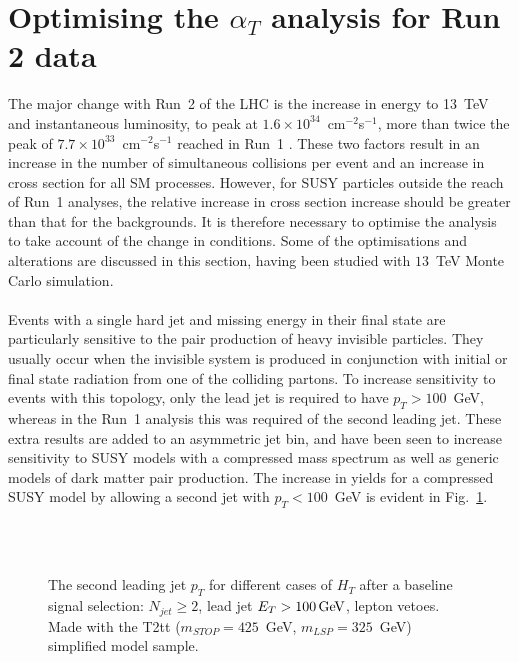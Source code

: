 
\section{Optimising the $\alpha_T$ analysis for Run 2 data}
\label{sec:analysisOptimisation}

The major change with Run~2 of the LHC is the increase in energy to 13~TeV and instantaneous luminosity, to peak at $1.6\times10^{34}$~cm$^{-2}$s$^{-1}$, more than twice the peak of $7.7\times10^{33}$~cm$^{-2}$s$^{-1}$ reached in Run~1 \cite{LHCLuminosityIPAC13}. These two factors result in an increase in the number of simultaneous collisions per event and an increase in cross section for all SM processes. However, for SUSY particles outside the reach of Run~1 analyses, the relative increase in cross section increase should be greater than that for the backgrounds. It is therefore necessary to optimise the analysis to take account of the change in conditions. Some of the optimisations and alterations are discussed in this section, having been studied with $13$~TeV Monte Carlo simulation.
\\\\
Events with a single hard jet and missing energy in their final state are particularly sensitive to the pair production of heavy invisible particles. They usually occur when the invisible system is produced in conjunction with initial or final state radiation from one of the colliding partons. To increase sensitivity to events with this topology, only the lead jet is required to have $p_T>100$~GeV, whereas in the Run~1 analysis this was required of the second leading jet. These extra results are added to an asymmetric jet bin, and have been seen to increase sensitivity to SUSY models with a compressed mass spectrum as well as generic models of dark matter pair production. The increase in yields for a compressed SUSY model by allowing a second jet with $p_T<100$~GeV is evident in Fig.~\ref{fig:asymMotivation}.
\\\\
\begin{figure}[h!]
  \centering
  ~~
  \\
  \caption{\label{fig:asymMotivation} The second leading jet $p_T$ for different
  cases of $H_T$ after a baseline signal selection: $N_{jet}\geq2$, lead jet
  $E_T>100\mathrm{\,Ge\kern -0.1em V}$, lepton vetoes. Made with the T2tt ($m_{STOP}=425$~GeV, $m_{LSP}=325$~GeV) simplified model sample.}
\end{figure}

